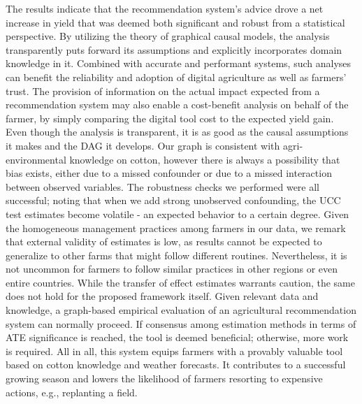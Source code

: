 \documentclass[letterpaper]{article} %
\begin{document}
The results indicate that the recommendation system's advice drove a net increase in yield that was deemed both significant and robust from a statistical perspective. By utilizing the theory of graphical causal models, the analysis transparently puts forward its assumptions and explicitly incorporates domain knowledge in it. Combined with accurate and performant systems, such analyses can benefit the reliability and adoption of digital agriculture as well as farmers' trust. The provision of information on the actual impact expected from a recommendation system may also enable a cost-benefit analysis on behalf of the farmer, by simply comparing the digital tool cost to the expected yield gain.  Even though the analysis is transparent, it is as good as the causal assumptions it makes and the DAG it develops. Our graph is consistent with agri-environmental knowledge on cotton, however there is always a possibility that bias exists, either due to a missed confounder or due to a missed interaction between observed variables. The robustness checks we performed were all successful; noting that when we add strong unobserved confounding, the UCC test estimates become volatile - an expected behavior to a certain degree.  Given the homogeneous management practices among farmers in our data, we remark that external validity of estimates is low, as results cannot be expected to generalize to other farms that might follow different routines. Nevertheless, it is not uncommon for farmers to follow similar practices in other regions or even entire countries. While the transfer of effect estimates warrants caution, the same does not hold for the proposed framework itself. Given relevant data and knowledge, a graph-based empirical evaluation of an agricultural recommendation system can normally proceed. If consensus among estimation methods in terms of ATE significance is reached, the tool is deemed beneficial; otherwise, more work is required.
All in all, this system equips farmers with a provably valuable tool based on cotton knowledge and weather forecasts. It contributes to a successful growing season and lowers the likelihood of farmers resorting to expensive actions, e.g., replanting a field.
\end{document}
